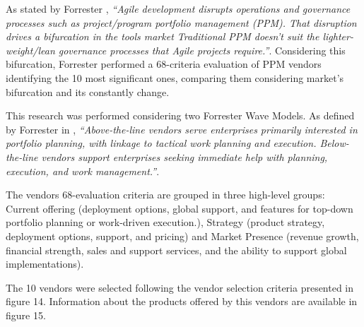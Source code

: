 As stated by Forrester \cite{forresterWavePPM}, \textit{``Agile development disrupts operations and governance processes such as project/program portfolio management (PPM). That disruption drives a bifurcation in the tools market \- Traditional PPM doesn't suit the lighter-weight/lean governance processes that Agile projects require.''}. Considering this bifurcation, Forrester performed a 68-criteria evaluation of PPM vendors identifying the 10 most significant ones, comparing them  considering market's bifurcation and its constantly change.\par
This research was performed considering two Forrester Wave Models. As defined by Forrester in \cite{forresterWavePPM}, \textit{``Above-the-line vendors serve enterprises primarily interested in portfolio planning, with linkage to tactical work planning and execution. Below-the-line vendors support enterprises seeking immediate help with planning, execution, and work management.''}.\par
The vendors 68-evaluation criteria are grouped in three high-level groups: Current offering (deployment options, global support, and features for top-down portfolio planning or work-driven execution.), Strategy (product strategy, deployment options, support, and pricing) and Market Presence (revenue growth, financial strength, sales and support services, and the ability to support global implementations).\par
The 10 vendors were selected following the vendor selection criteria presented in figure 14. Information about the products offered by this vendors are available in figure 15.\par


